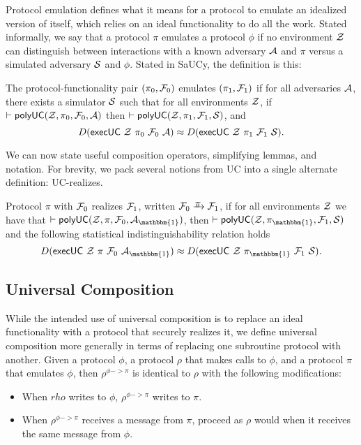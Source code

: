 Protocol emulation defines what it means for a protocol to emulate an idealized
version of itself, which relies on an ideal functionality to do all the
work. Stated informally, we say that a protocol $\pi$ emulates a protocol $\phi$ if no
environment $\mathcal{{Z}}$ can distinguish between interactions with a known adversary
$\mathcal{{A}}$ and $\pi$ versus a simulated adversary $\mathcal{{S}}$ and $\phi$. Stated in SaUCy,
the definition is this:
\begin{definition}[Emulation]
  The protocol-functionality pair $(\pi_0, \mathcal{{F}}_0)$ emulates $(\pi_1, \mathcal{{F}}_1)$
  if for all adversaries $\mathcal{{A}}$, there exists a simulator $\mathcal{{S}}$
  such that for all environments $\mathcal{{Z}}$, if $|- \text{\textsf{polyUC}}(\mathcal{{Z}}, \pi_0,
  \mathcal{{F}}_0, \mathcal{{A}})$ then $|- \text{\textsf{polyUC}}(\mathcal{{Z}}, \pi_1, \mathcal{{F}}_1, \mathcal{{S}})$,
  and
  \[ D(\mathsf{execUC}\ \mc{Z}\ \pi_0\ \mc{F}_0\ \mc{A}) \approx D(\mathsf{execUC}\ \mc{Z}\ \pi_1\ \mc{F}_1\ \mc{S}).\]
\end{definition}

We can now state useful composition operators, simplifying lemmas, and
notation. For brevity, we pack several notions from UC into a single alternate
definition: UC-realizes.

\begin{definition}[UC-realizes]
  Protocol $\pi$ with $\mathcal{{F}}_0$ realizes $\mathcal{{F}}_1$, written $\mc{F}_0
  \yrightarrow{$\pi$} \mc{F}_1$, if for all environments $\mathcal{{Z}}$ we have that $|-
  \keyword{polyUC}(\mc{Z}, \pi, \mc{F}_0, \mc{A}_{\mathbbm{1}})$, then
  $|- \keyword{polyUC}(\mc{Z}, \pi_{\mathbbm{1}}, \mc{F}_1, \mc{S})$ and the
  following statistical indistinguishability relation holds
  \[ D(\mathsf{execUC}\ \mc{Z}\ \pi\ \mc{F}_0\ \mc{A}_{\mathbbm{1}}) \approx D(\mathsf{execUC}\ \mc{Z}\ \pi_{\mathbbm{1}}\ \mc{F}_1\ \mc{S}).\]
\end{definition}

\subsection{Universal Composition}
\label{subsec:composition}

While the intended use of universal composition is to replace an ideal
functionality with a protocol that securely realizes it, we define universal
composition more generally in terms of replacing one subroutine protocol with
another. Given a protocol $\phi$, a protocol $\rho$ that makes calls to $\phi$, and a
protocol $\pi$ that emulates $\phi$, then $\rho^{\phi -> \pi}$ is identical to $\rho$ with the
following modifications:
\begin{itemize}[leftmargin=*]
  \item When $rho$ writes to $\phi$, $\rho^{\phi -> \pi}$ writes to $\pi$.
  \item When $\rho^{\phi -> \pi}$ receives a message from $\pi$, proceed as $\rho$ would when
    it receives the same message from $\phi$.
\end{itemize}

